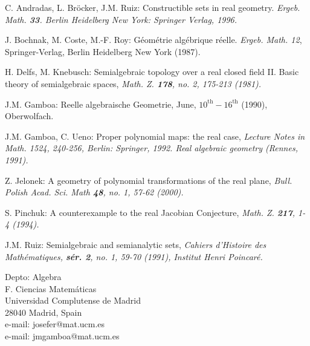 \documentclass[11pt,draft]{article}
\begin{document}
\begin{thebibliography}{9999}

 C. Andradas, L. Br\"ocker, J.M. Ruiz: Constructible 
sets in real geometry.  \em Ergeb.  Math.  \em {\bf 33}.  Berlin Heidelberg 
New York: Springer Verlag, 1996.

 J. Bochnak, M. Coste, M.-F. Roy: G\'eom\'etrie
alg\'ebrique r\'eelle. {\em Ergeb. Math. 12}, Springer-Verlag,
Berlin Heidelberg New York (1987).

 H. Delfs, M. Knebusch: Semialgebraic topology over a real closed field II. Basic
theory of semialgebraic spaces, \em Math. Z. \em {\bf 178}, no. 2, 175-213 (1981). 

 J.M. Gamboa: Reelle algebraische Geometrie, June,
$10^{\text{th}}-16^{\text{th}}$ (1990), Oberwolfach.

 J.M. Gamboa, C. Ueno: Proper polynomial maps: the real case, \em Lecture Notes in Math. \em
1524, 240-256, Berlin: Springer, 1992. \em Real algebraic geometry (Rennes, 1991)\em.

 Z. Jelonek: A geometry of polynomial transformations of the real plane, \em 
Bull. Polish Acad. Sci. Math \em {\bf 48}, no. 1, 57-62 (2000).

 S. Pinchuk: A counterexample to the real Jacobian Conjecture, \em Math. Z.
\em {\bf 217}, 1-4 (1994).

 J.M. Ruiz: Semialgebraic and semianalytic sets, \em Cahiers d'Histoire des 
Math\'e\-ma\-ti\-ques\em, {\bf s\'er. 2}, no. 1, 59-70 (1991), Institut Henri Poincar\'e.


 

\end{thebibliography}

\makeatletter
 
\noindent Depto: Algebra\\ 
F. Ciencias Matem\'aticas\\
Universidad Complutense de Madrid\\
28040 Madrid, Spain\\
e-mail: josefer@mat.ucm.es\\
e-mail: jmgamboa@mat.ucm.es
\makeatother
\end{document}
